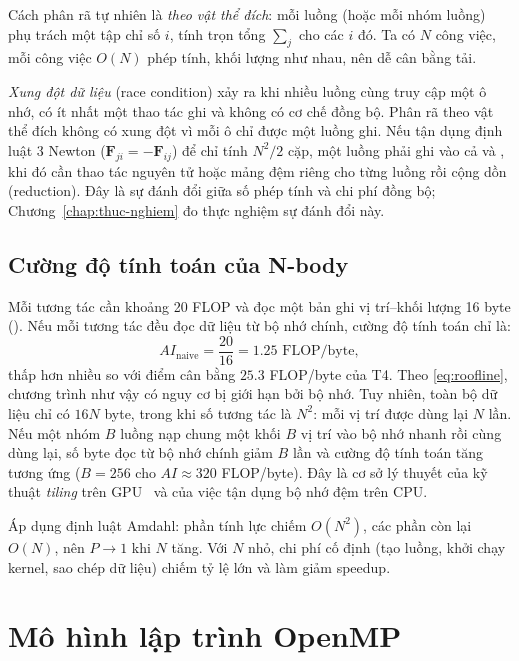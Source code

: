 Cách phân rã tự nhiên là \emph{theo vật thể đích}: mỗi luồng (hoặc mỗi nhóm luồng) phụ trách một tập chỉ số $i$, tính trọn tổng $\sum_j$ cho các $i$ đó. Ta có $N$ công việc, mỗi công việc $O(N)$ phép tính, khối lượng như nhau, nên dễ cân bằng tải.

\emph{Xung đột dữ liệu} (race condition) xảy ra khi nhiều luồng cùng truy cập một ô nhớ, có ít nhất một thao tác ghi và không có cơ chế đồng bộ. Phân rã theo vật thể đích không có xung đột vì mỗi ô  chỉ được một luồng ghi. Nếu tận dụng định luật 3 Newton ($\mathbf{F}_{ji}=-\mathbf{F}_{ij}$) để chỉ tính $N^2/2$ cặp, một luồng phải ghi vào cả  và , khi đó cần thao tác nguyên tử hoặc mảng đệm riêng cho từng luồng rồi cộng dồn (reduction). Đây là sự đánh đổi giữa số phép tính và chi phí đồng bộ; Chương~\ref{chap:thuc-nghiem} đo thực nghiệm sự đánh đổi này.

\subsection{Cường độ tính toán của N-body}

Mỗi tương tác cần khoảng 20 FLOP và đọc một bản ghi vị trí--khối lượng 16 byte (). Nếu mỗi tương tác đều đọc dữ liệu từ bộ nhớ chính, cường độ tính toán chỉ là:
\begin{equation}
AI_{\text{naive}} = \frac{20}{16} = 1.25 \text{ FLOP/byte},
\end{equation}
thấp hơn nhiều so với điểm cân bằng $25.3$ FLOP/byte của T4. Theo \eqref{eq:roofline}, chương trình như vậy có nguy cơ bị giới hạn bởi bộ nhớ. Tuy nhiên, toàn bộ dữ liệu chỉ có $16N$ byte, trong khi số tương tác là $N^2$: mỗi vị trí được dùng lại $N$ lần. Nếu một nhóm $B$ luồng nạp chung một khối $B$ vị trí vào bộ nhớ nhanh rồi cùng dùng lại, số byte đọc từ bộ nhớ chính giảm $B$ lần và cường độ tính toán tăng tương ứng ($B=256$ cho $AI \approx 320$ FLOP/byte). Đây là cơ sở lý thuyết của kỹ thuật \emph{tiling} trên GPU~\cite{gpugems3} và của việc tận dụng bộ nhớ đệm trên CPU.

Áp dụng định luật Amdahl: phần tính lực chiếm $O(N^2)$, các phần còn lại $O(N)$, nên $P \to 1$ khi $N$ tăng. Với $N$ nhỏ, chi phí cố định (tạo luồng, khởi chạy kernel, sao chép dữ liệu) chiếm tỷ lệ lớn và làm giảm speedup.

\section{Mô hình lập trình OpenMP}
\label{sec:openmp}

